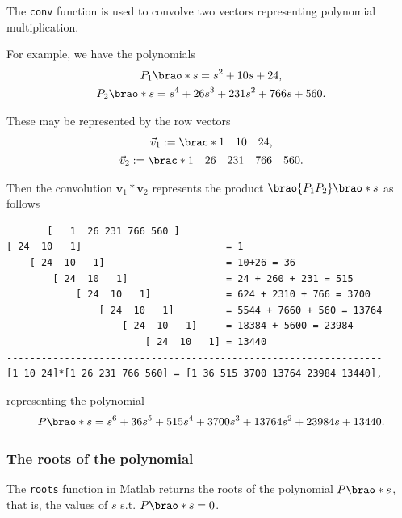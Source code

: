 \documentclass[12pt]{article}
\DeclarePairedDelimiter\brao()%
\DeclarePairedDelimiter\brac[]%
\begin{document}
The \texttt{conv} function is used to convolve two vectors representing polynomial multiplication.

For example, we have the polynomials
\[
    \begin{gathered}
        P_1\brao*s = s^2 + 10s + 24\rlap, \\*
        P_2\brao*s = s^4 + 26s^3 + 231s^2 + 766s + 560\rlap. \\*
    \end{gathered}
\]

These may be represented by the row vectors
\[
    \begin{gathered}
        \vec{v}_1 := \brac*{\begin{matrix} 1 & 10 & 24 \\* \end{matrix}}\rlap, \\*
        \vec{v}_2 := \brac*{\begin{matrix} 1 & 26 & 231 & 766 & 560 \\* \end{matrix}}\rlap. \\*
    \end{gathered}
\]

\pagebreak

Then the convolution $\mathbf{v}_1 \ast \mathbf{v}_2$ represents the product $\brao{P_1 P_2}\brao*s$ as follows

\begin{verbatim}
       [   1  26 231 766 560 ]
[ 24  10   1]                         = 1
    [ 24  10   1]                     = 10+26 = 36
        [ 24  10   1]                 = 24 + 260 + 231 = 515
            [ 24  10   1]             = 624 + 2310 + 766 = 3700
                [ 24  10   1]         = 5544 + 7660 + 560 = 13764
                    [ 24  10   1]     = 18384 + 5600 = 23984
                        [ 24  10   1] = 13440
-----------------------------------------------------------------
[1 10 24]*[1 26 231 766 560] = [1 36 515 3700 13764 23984 13440],
\end{verbatim}

representing the polynomial
\[
    P\brao*s = s^6 + 36s^5 + 515s^4 + 3700s^3 + 13764s^2 + 23984s + 13440\rlap.
\]

\subsubsection{The roots of the polynomial}

The \texttt{roots} function in Matlab returns the roots of the polynomial $P\brao*s$, that is, the values of $s$ s.t. $P\brao*s = 0$.
\end{document}
